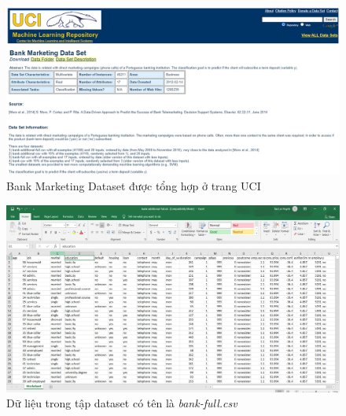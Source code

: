 \documentclass{report}
\begin{document}
    \begin{figure}[htp]
    	\begin{center}
    		\includegraphics[scale = 0.65]{image/uci.png}
    		\caption{Bank Marketing Dataset được tổng hợp ở trang UCI}
    	\end{center}
    \end{figure}
    
    \begin{figure}[htp]
    	\begin{center}
    		\includegraphics[scale = 0.65]{image/dataset.png}
    		\caption{Dữ liệu trong tập dataset có tên là \textit{bank-full.csv}}
    	\end{center}
    \end{figure}
    
\pagebreak

\fontsize{16}{10}\selectfont
\end{document}
